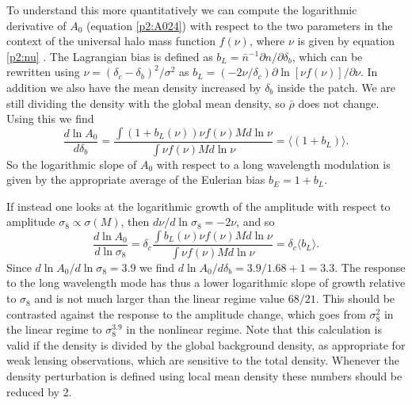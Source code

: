 \documentclass[
  11pt,
  twoside,
  openright,
  titlepage,
  headings=optiontoheadandtoc
]{scrbook}
\begin{document}
To understand this more quantitatively we can compute the logarithmic 
derivative of $A_0$ (equation \ref{p2:A024}) with respect to the 
two parameters in the context of the universal halo mass function $f(\nu)$, where $\nu$ is given by equation \ref{p2:nu}
\citep{2008JCAP...08..031S}. 
The Lagrangian bias is defined as $b_L=\bar{n}^{-1}\partial n/\partial \delta_b$, which can be rewritten using 
$\nu=(\delta_c-\delta_b)^2/\sigma^2$ as $b_L=(-2\nu/\delta_c)\partial \ln[\nu f(\nu)]/\partial \nu$. 
In addition we also have the mean density increased by $\delta_b$ inside the patch. We are still dividing
the density with the 
global mean density, so $\bar{\rho}$ does not change. 
Using this we find 
\begin{equation}
\frac{d \ln A_0}{d \delta_b}
=\frac{\int (1+b_L(\nu)) \nu f(\nu) M d\ln \nu}
{\int \nu f(\nu) M d\ln \nu}
=\langle (1+b_L) \rangle. 
\end{equation}
So the logarithmic slope of $A_0$ with respect to a long wavelength modulation is given by the appropriate 
average of the Eulerian bias $b_E=1+b_L$. 

If instead one looks at the logarithmic growth of the amplitude with respect to amplitude $\sigma_8 \propto \sigma(M)$, 
then $d\nu/d\ln \sigma_8=-2\nu$, and so 
\begin{equation}
\frac{d \ln A_0}{d \ln \sigma_8}
=\delta_c\frac{\int b_L(\nu) \nu f(\nu)M d\ln \nu}
{\int \nu f(\nu)M d\ln \nu}
=\delta_c \langle b_L \rangle.
\end{equation}
Since $d \ln A_0 /d\ln \sigma_8 = 3.9$ we find $d \ln A_0 / d \delta_b = 3.9/1.68+1 = 3.3$. 
The response to the long wavelength mode has thus a lower logarithmic slope of growth relative to $\sigma_8$ and 
is not much larger than the linear regime value $68/21$. This should be contrasted against the response to the 
amplitude change, which goes from $\sigma_8^2$ in the linear regime to $\sigma_8^{3.9}$ in the nonlinear regime. 
Note that this calculation is valid if the density is divided by the global background density, as appropriate 
for weak lensing observations, which are sensitive to the total density. Whenever the density perturbation is 
defined using local mean density these numbers should be reduced by 2. 
\end{document}
